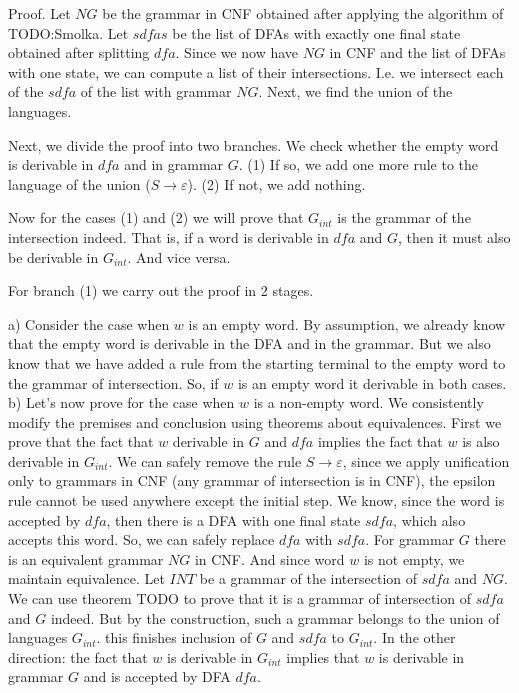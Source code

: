 Proof. 
Let $NG$ be the grammar in CNF obtained after applying the algorithm of TODO:Smolka. Let $sdfas$ be the list of DFAs with exactly one final state obtained after splitting $dfa$.
Since we now have $NG$ in CNF and the list of DFAs with one state, we can compute a list of their intersections.
I.e. we intersect each of the $sdfa$ of the list with grammar $NG$.
Next, we find the union of the languages. 

Next, we divide the proof into two branches.
We check whether the empty word is derivable in $dfa$ and in grammar $G$.
(1) If so, we add one more rule to the language of the union ($ S \to \varepsilon$). (2) If not, we add nothing.

Now for the cases (1) and (2) we will prove that $G_{int}$ is the grammar of the intersection indeed.
That is, if a word is derivable in $dfa$ and $G$, then it must also be derivable in $G_{int}$. And vice versa.

For branch (1) we carry out the proof in 2 stages.

a) Consider the case when $w$ is an empty word.
By assumption, we already know that the empty word is derivable in the DFA and in the grammar. But we also know that we have added a rule from the starting terminal to the empty word to the grammar of intersection. So, if $w$ is an empty word it derivable in both cases.
b) Let's now prove for the case when $w$ is a non-empty word.
We consistently modify the premises and conclusion using theorems about equivalences. First we prove that the fact that $w$ derivable in $G$ and $dfa$ implies the fact that $w$ is also derivable in $G_{int}$. We can safely remove the rule $S \to \varepsilon$, since we apply unification only to grammars in CNF (any grammar of intersection is in CNF), the epsilon rule cannot be used anywhere except the initial step.
We know, since the word is accepted by $dfa$, then there is a DFA with one final state $sdfa$, which also accepts this word. So, we can safely replace $dfa$ with $sdfa$. 
For grammar $G$ there is an equivalent grammar $NG$ in CNF. And since word $w$ is not empty, we maintain equivalence.
Let $INT$ be a grammar of the intersection of $sdfa$ and $NG$. We can use theorem TODO to prove that it is a grammar of intersection of $sdfa$ and $G$ indeed. 
But by the construction, such a grammar belongs to the union of languages $G_{int}$. this finishes inclusion of $G$ and $sdfa$ to $G_{int}$.
In the other direction: the fact that $w$ is derivable in $G_{int}$ implies that $w$ is derivable in grammar $G$ and is accepted by DFA $dfa$. 

